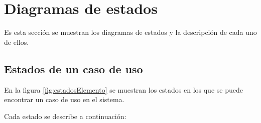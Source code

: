 \section{Diagramas de estados}
Es esta sección se muestran los diagramas de estados y la descripción de cada uno de ellos.\\

\subsection{Estados de un caso de uso}

En la figura \ref{fig:estadosElemento} se muestran los estados en los que se puede encontrar un caso de uso en el sistema. 


\clearpage
Cada estado se describe a continuación:

